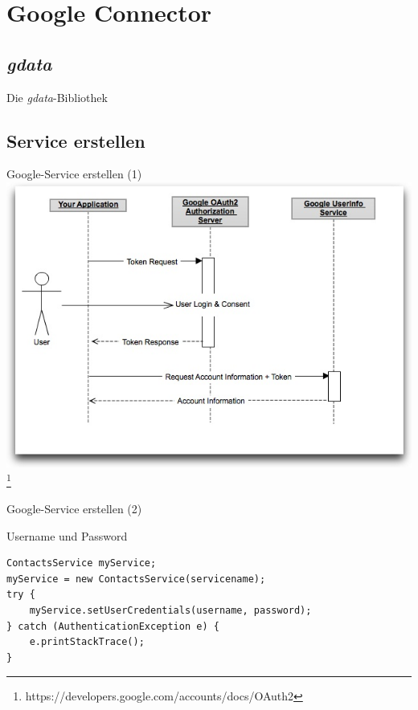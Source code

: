 \section{Google Connector}
\subsection{\emph{gdata}}

\begin{frame}{Die \emph{gdata}-Bibliothek}

\end{frame}

\subsection{Service erstellen}

\begin{frame}[fragile]{Google-Service erstellen (1)}
\includegraphics[width=\textwidth]{Bilder/googleOauth.jpg}
\footnote{https://developers.google.com/accounts/docs/OAuth2}
\end{frame}

\begin{frame}[fragile]{Google-Service erstellen (2)}
\begin{block}{Username und Password}
\javalstset
\begin{lstlisting}
ContactsService myService;
myService = new ContactsService(servicename);
try {
	myService.setUserCredentials(username, password);
} catch (AuthenticationException e) {
	e.printStackTrace();
}
\end{lstlisting}
\end{block}
\end{frame}

